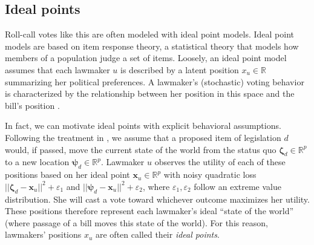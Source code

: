 \subsection{Ideal points}

Roll-call votes like this are often modeled with ideal point models.  Ideal point
models are based on item response theory, a statistical theory that
models how members of a population judge a set of items.  Loosely, an
ideal point model assumes that each lawmaker $u$ is described by a
latent position $x_u \in \mathbb{R}$ summarizing her political
preferences.  A lawmaker's (stochastic) voting behavior is
characterized by the relationship between her position in this space
and the bill's position
\citep{poole:1985,poole:1991,jackman:2001,martin:2002,clinton:2004}.

In fact, we can motivate ideal points with explicit behavioral
assumptions.  Following the treatment in \cite{clinton:2004}, we
assume that a proposed item of legislation $d$ would, if passed, move
the current state of the world from the status quo $\bm \zeta_d \in
\mathbb{R}^p$ to a new location $\bm \psi_d \in \mathbb{R}^p$.
Lawmaker $u$ observes the utility of each of these positions based on
her ideal point $\bm x_u \in \mathbb{R}^p$ with noisy quadratic loss
$|| \bm \zeta_d - \bm x_u ||^2 + \varepsilon_1$ and $|| \bm \psi_d -
\bm x_u ||^2 + \varepsilon_2$, where $\varepsilon_1, \varepsilon_2$
follow an extreme value distribution.  She will cast a vote toward
whichever outcome maximizes her utility.  These positions therefore
represent each lawmaker's ideal ``state of the world'' (where passage
of a bill moves this state of the world).  For this reason, lawmakers'
positions $x_u$ are often called their \emph{ideal points}.

